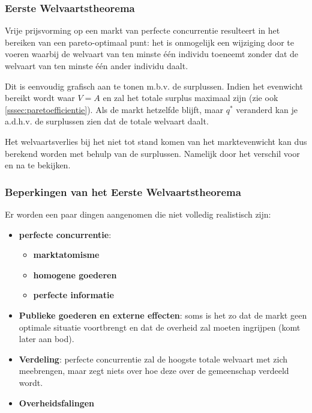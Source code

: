 \subsubsection{Eerste Welvaartstheorema}
Vrije prijsvorming op een markt van perfecte concurrentie resulteert in het bereiken van een pareto-optimaal punt: het is onmogelijk een wijziging door te voeren waarbij de welvaart van ten minste \'e\'en individu toeneemt zonder dat de welvaart van ten minste \'e\'en ander individu daalt.

Dit is eenvoudig grafisch aan te tonen m.b.v. de surplussen. Indien het evenwicht bereikt wordt waar $V=A$ en zal het totale surplus maximaal zijn (zie ook \ref{sssec:paretoefficientie}). Als de markt hetzelfde blijft, maar $q^*$ veranderd kan je a.d.h.v. de surplussen zien dat de totale welvaart daalt.

Het welvaartsverlies bij het niet tot stand komen van het marktevenwicht kan dus berekend worden met behulp van de surplussen. Namelijk door het verschil voor en na te bekijken.

\subsubsection{Beperkingen van het Eerste Welvaartstheorema}
Er worden een paar dingen aangenomen die niet volledig realistisch zijn:
\begin{itemize}
   \item \textbf{perfecte concurrentie}:
      \begin{itemize}
         \item \textbf{marktatomisme}
         \item \textbf{homogene goederen}
         \item \textbf{perfecte informatie}
      \end{itemize}
   \item \textbf{Publieke goederen en externe effecten}: soms is het zo dat de markt geen optimale situatie voortbrengt en dat de overheid zal moeten ingrijpen (komt later aan bod).
   \item \textbf{Verdeling}: perfecte concurrentie zal de hoogste totale welvaart met zich meebrengen, maar zegt niets over hoe deze over de gemeenschap verdeeld wordt.
   \item \textbf{Overheidsfalingen}
\end{itemize}
